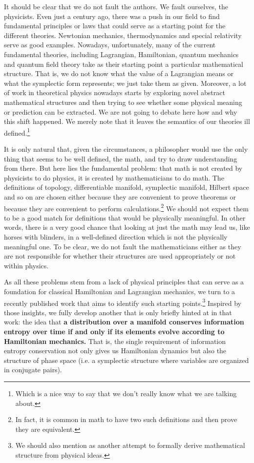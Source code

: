 \documentclass[11pt]{article}
\begin{document}
It should be clear that we do not fault the authors. We fault ourselves, the physicists. Even just a century ago, there was a push in our field to find fundamental principles or laws that could serve as a starting point for the different theories. Newtonian mechanics, thermodynamics and special relativity serve as good examples. Nowadays, unfortunately, many of the current fundamental theories, including Lagrangian, Hamiltonian, quantum mechanics and quantum field theory take as their starting point a particular mathematical structure. That is, we do not know what the value of a Lagrangian means or what the symplectic form represents; we just take them as given. Moreover, a lot of work in theoretical physics nowadays starts by exploring novel abstract mathematical structures and then trying to see whether some physical meaning or prediction can be extracted. We are not going to debate here how and why this shift happened. We merely note that it leaves the semantics of our theories ill defined.\footnote{Which is a nice way to say that we don't really know what we are talking about.} 

It is only natural that, given the circumstances, a philosopher would use the only thing that seems to be well defined, the math, and try to draw understanding from there. But here lies the fundamental problem: that math is not created by physicists to do physics, it is created by mathematicians to do math. The definitions of topology, differentiable manifold, symplectic manifold, Hilbert space and so on are chosen either because they are convenient to prove theorems or because they are convenient to perform calculations.\footnote{In fact, it is common in math to have two such definitions and then prove they are equivalent.} We should not expect them to be a good match for definitions that would be physically meaningful. In other words, there is a very good chance that looking at just the math may lead us, like horses with blinders, in a well-defined direction which is not the physically meaningful one. To be clear, we do not fault the mathematicians either as they are not responsible for whether their structures are used appropriately or not within physics.

As all these problems stem from a lack of physical principles that can serve as a foundation for classical Hamiltonian and Lagrangian mechanics, we turn to a recently published work\cite{AoPPhy1} that aims to identify such starting points.\footnote{We should also mention \cite{Maudlin} as another attempt to formally derive mathematical structure from physical ideas.} Inspired by those insights, we fully develop another that is only briefly hinted at in that work: the idea that \textbf{a distribution over a manifold conserves information entropy over time if and only if its elements evolve according to Hamiltonian mechanics.} That is, the single requirement of information entropy conservation not only gives us Hamiltonian dynamics but also the structure of phase space (i.e. a symplectic structure where variables are organized in conjugate pairs).
\end{document}
